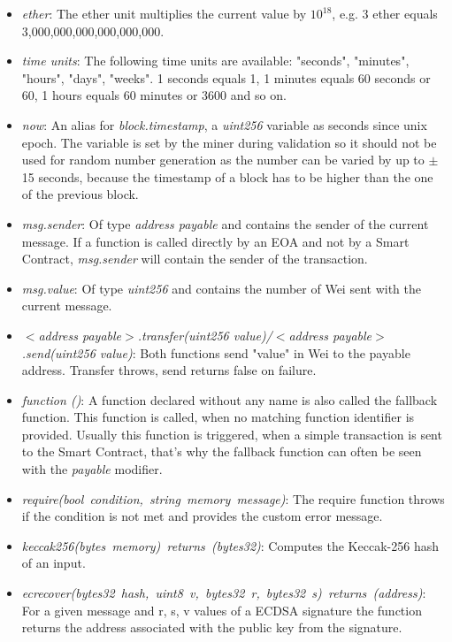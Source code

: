 \begin{itemize}
  \item \textit{ether}: The ether unit multiplies the current value by \(10^{18}\), e.g. 3 ether equals 3,000,000,000,000,000,000.
  \item \textit{time units}: The following time units are available: "seconds", "minutes", "hours", "days", "weeks". 1 seconds equals 1, 1 minutes equals 60 seconds or 60, 1 hours equals 60 minutes or 3600 and so on.
  \item \textit{now}: An alias for \textit{block.timestamp}, a \textit{uint256} variable as seconds since unix epoch. The variable is set by the miner during validation so it should not be used for random number generation as the number can be varied by up to $\pm$ 15 seconds, because the timestamp of a block has to be higher than the one of the previous block.
  \item \textit{msg.sender}: Of type \textit{address payable} and contains the sender of the current message. If a function is called directly by an EOA and not by a Smart Contract, \textit{msg.sender} will contain the sender of the transaction.
  \item \textit{msg.value}: Of type \textit{uint256} and contains the number of Wei sent with the current message.
  \item \textit{$<$address payable$>$.transfer(uint256 value)/$<$address payable$>$.send(uint256 value)}: Both functions send "value" in Wei to the payable address. Transfer throws, send returns false on failure.
  \item \textit{function ()}: A function declared without any name is also called the fallback function. This function is called, when no matching function identifier is provided. Usually this function is triggered, when a simple transaction is sent to the Smart Contract, that's why the fallback function can often be seen with the \textit{payable} modifier.
  \item \textit{require(bool condition, string memory message)}: The require function throws if the condition is not met and provides the custom error message.
  \item \textit{keccak256(bytes memory) returns (bytes32)}: Computes the Keccak-256 hash of an input.
  \item \textit{ecrecover(bytes32 hash, uint8 v, bytes32 r, bytes32 s) returns (address)}: For a given message and r, s, v values of a ECDSA signature the function returns the address associated with the public key from the signature.
\end{itemize}
